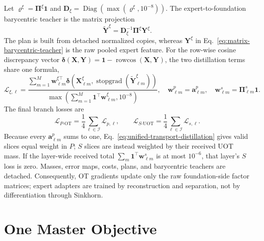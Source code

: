 \documentclass[10pt]{article}
\newcommand{\cI}{\mathcal{I}}
\newcommand{\cL}{\mathcal{L}}
\newcommand{\ones}{\bm{1}}
\newcommand{\diag}{\operatorname{Diag}}
\newcommand{\stopgrad}{\operatorname{stopgrad}}
\newcommand{\rowcos}{\operatorname{rowcos}}
\begin{document}
Let $\bm\varrho^\xi=\bm\Pi^\xi\ones$ and
$\bm D_\xi=\diag(\max(\bm\varrho^\xi,10^{-8}))$.  The expert-to-foundation
barycentric teacher is the matrix projection
\begin{equation}
    \widetilde{\bm Y}^{\xi}
    =\bm D_\xi^{-1}\bm\Pi^\xi\bm Y^\xi.
    \label{eq:matrix-barycentric-teacher}
\end{equation}
The plan is built from detached normalized copies, whereas $\bm Y^\xi$ in
Eq.~\eqref{eq:matrix-barycentric-teacher} is the raw pooled expert feature.
For the row-wise cosine discrepancy vector
$\bm\delta(\bm X,\bm Y)=\ones-\rowcos(\bm X,\bm Y)$, the two distillation
terms share one formula,
\begin{equation}
\boxed{
 \cL_{\xi,\ell}
 =\frac{\displaystyle\sum_{m=1}^{M}
   \bm w_{\ell m}^{\xi\top}
   \bm\delta\!\left(\bm X_{\ell m}^\xi,
      \stopgrad(\widetilde{\bm Y}_{\ell m}^{\xi})\right)}
   {\displaystyle\max\!\left(
      \sum_{m=1}^{M}\ones^\top\bm w_{\ell m}^\xi,10^{-8}\right)},
 \quad
 \bm w_{\ell m}^p=\bm a_{\ell m}^p,\quad
 \bm w_{\ell m}^s=\bm\Pi_{\ell m}^s\ones.}
 \label{eq:unified-transport-distillation}
\end{equation}
The final branch losses are
\begin{equation}
 \cL_{P\text{-OT}}=\frac14\sum_{\ell\in\cI}\cL_{p,\ell},
 \qquad
 \cL_{S\text{-UOT}}=\frac14\sum_{\ell\in\cI}\cL_{s,\ell}.
\end{equation}
Because every $\bm a^p_{\ell m}$ sums to one, Eq.~\eqref{eq:unified-transport-distillation}
gives valid slices equal weight in $P$; $S$ slices are instead weighted by
their received UOT mass.  If the layer-wide received total
$\sum_m\ones^\top\bm w^s_{\ell m}$ is at most $10^{-6}$, that layer's $S$
loss is zero.  Masses, error maps, costs, plans, and barycentric
teachers are detached.  Consequently, OT gradients update only the raw
foundation-side factor matrices; expert adapters are trained by reconstruction
and separation, not by differentiation through Sinkhorn.

\section{One Master Objective}
\end{document}
